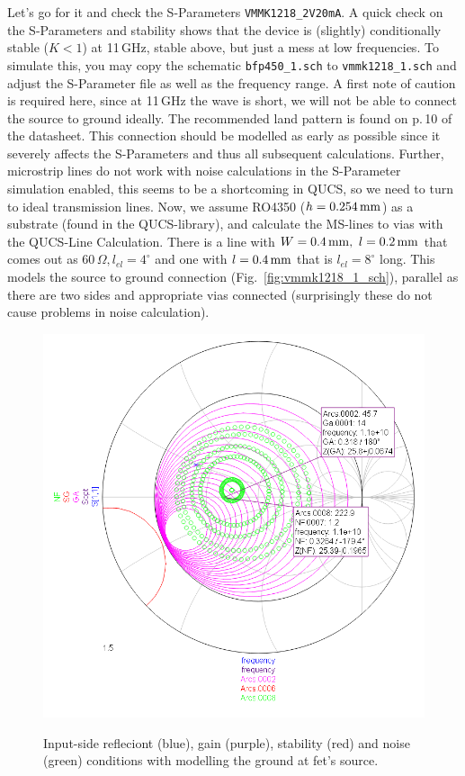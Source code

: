 Let's go for it and check the S-Parameters {\tt VMMK1218\_2V20mA}. A
quick check on the S-Parameters and stability shows that the device is
(slightly) conditionally stable ($K<1$) at 11\,GHz, stable above, but
just a mess at low frequencies. To simulate this, you may copy the
schematic {\tt bfp450\_1.sch} to {\tt vmmk1218\_1.sch} and adjust the
S-Parameter file as well as the frequency range. A first note of
caution is required here, since at 11\,GHz the wave is short, we will
not be able to connect the source to ground ideally. The recommended
land pattern is found on p.\,10 of the datasheet. This connection
should be modelled as early as possible since it severely affects the
S-Parameters and thus all subsequent calculations. Further, microstrip
lines do not work with noise calculations in the S-Parameter
simulation enabled, this seems to be a shortcoming in QUCS, so we need
to turn to ideal transmission lines. Now, we assume RO4350
($h=0.254\,\mathrm{mm}$) as a substrate (found in the QUCS-library), and
calculate the MS-lines to vias with the QUCS-Line Calculation. There
is a line with $W=0.4\,\mathrm{mm},\ l=0.2\,\mathrm{mm}$ that comes out as
$60\,\Omega, l_{el}=4^\circ$ and one with $l=0.4\,\mathrm{mm}$ that is
$l_{el}=8^\circ$ long. This models the source to ground connection
(Fig.~\ref{fig:vmmk1218_1_sch}), parallel as there are two sides and
appropriate vias connected (surprisingly these do not cause problems
in noise calculation).

\begin{figure}
  \centering
  {\includegraphics[width=12cm]{vmmk1218_1_source.png}}
  \caption{Input-side refleciont (blue), gain (purple), stability
    (red) and noise (green) conditions with modelling the ground at
    fet's source.}
  \label{fig:vmmk1218_1_source}
\end{figure}

